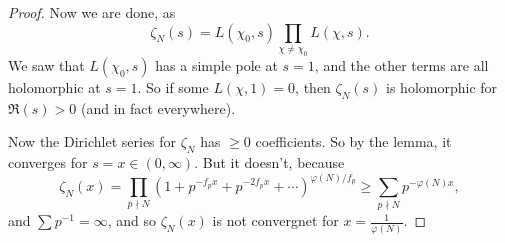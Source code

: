 \documentclass[a4paper]{article}
\begin{document}
\begin{proof}
  Now we are done, as
  \[
    \zeta_N(s) = L(\chi_0, s) \prod_{\chi \not= \chi_0} L(\chi, s).
  \]
  We saw that $L(\chi_0, s)$ has a simple pole at $s = 1$, and the other terms are all holomorphic at $s = 1$. So if some $L(\chi, 1) = 0$, then $\zeta_N(s)$ is holomorphic for $\Re(s) > 0$ (and in fact everywhere).

  Now the Dirichlet series for $\zeta_N$ has $\geq 0$ coefficients. So by the lemma, it converges for $s = x \in (0, \infty)$. But it doesn't, because
  \[
    \zeta_N(x) = \prod_{p \nmid N} (1 + p^{-f_p x} + p^{-2 f_p x} + \cdots)^{\varphi(N)/f_p} \geq \sum_{p \nmid N} p^{- \varphi(N) x},
  \]
  and $\sum p^{-1} = \infty$, and so $\zeta_N(x)$ is not convergnet for $x = \frac{1}{\varphi(N)}$.
\end{proof}
\printindex
\end{document}
